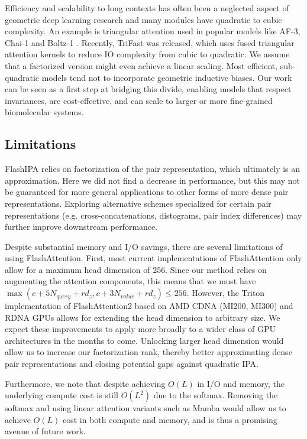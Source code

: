 \documentclass{article}
\begin{document}
Efficiency and scalability to long contexts has often been a neglected aspect of geometric deep learning research and many modules have quadratic to cubic complexity. An example is triangular attention used in popular models like AF-3\cite{abramson2024accurate}, Chai-1\cite{chai2024chai} and Boltz-1 \cite{wohlwend2024boltz}. Recently, TriFast \cite{trifast} was released, which uses fused triangular attention kernels to reduce IO complexity from cubic to quadratic. We assume that a factorized version might even achieve a linear scaling. 
Most efficient, sub-quadratic models tend not to incorporate geometric inductive biases. Our work can be seen as a first step at bridging this divide, enabling models that respect invariances, are cost-effective, and can scale to larger or more fine-grained biomolecular systems.



\subsection{Limitations}

FlashIPA relies on factorization of the pair representation, which ultimately is an approximation. Here we did not find a decrease in performance, but this may not be guaranteed for more general applications to other forms of more dense pair representations. Exploring alternative schemes specialized for certain pair representations (e.g. cross-concatenations, distograms, pair index differences) may further improve downstream performance.

Despite substantial memory and I/O savings, there are several limitations of using FlashAttention. First, most current implementations of FlashAttention only allow for a maximum head dimension of 256. Since our method relies on augmenting the attention components, this means that we must have $\max(c+5N_{query}+rd_z, c+3N_{value}+rd_z)\leq 256$. However, the Triton implementation of FlashAttention2 based on AMD CDNA (MI200, MI300) and RDNA GPUs allows for extending the head dimension to arbitrary size. We expect these improvements to apply more broadly to a wider class of GPU architectures in the months to come. Unlocking larger head dimension would allow us to increase our factorization rank, thereby better approximating dense pair representations and closing potential gaps against quadratic IPA.

Furthermore, we note that despite achieving $O(L)$ in I/O and memory, the underlying compute cost is still $O(L^2)$ due to the softmax. Removing the softmax and using linear attention variants such as Mamba would allow us to achieve $O(L)$ cost in both compute and memory, and is thus a promising avenue of future work.
\end{document}
